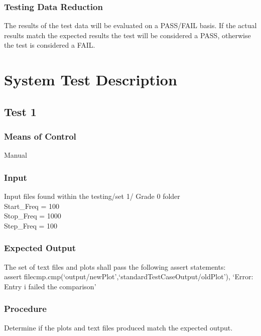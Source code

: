\documentclass[12pt]{article}
\begin{document}
\subsubsection{ Testing Data Reduction}
The results of the test data will be evaluated on a PASS/FAIL basis. If the actual results match the expected
results the test will be considered a PASS, otherwise the test is considered a FAIL. 


%
%

\section{System Test Description}


\subsection{Test 1}

\subsubsection{Means of Control}
Manual
\subsubsection{Input} \label{Input_Grade0}
Input files found within the testing/set 1/ Grade 0 folder\\
Start\_Freq = 100\\
Stop\_Freq = 1000\\
Step\_Freq = 100

\subsubsection{Expected Output}
The set of text files and plots shall pass the following assert statements:\\
assert filecmp.cmp(`output/newPlot',`standardTestCaseOutput/oldPlot'),
 `Error: Entry i failed the comparison'\\

\subsubsection{Procedure}
Determine if the plots and text files produced match the expected output. 
\end{document}
